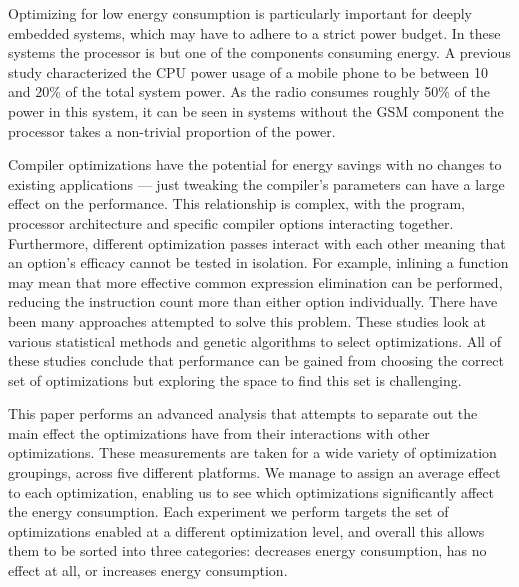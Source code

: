 \documentclass[twocolumn]{article}
\newcommand{\todo}[1]{\textbf{\textcolor{red}{#1}}}
\begin{document}
Optimizing for low energy consumption is particularly important for deeply embedded systems, which may have to adhere to a strict power budget. In these systems the processor is but one of the components consuming energy. A previous study characterized the CPU power usage of a mobile phone to be between 10 and 20\% of the total system power\cite{SmartPhonePower}. As the radio consumes roughly 50\% of the power in this system, it can be seen in systems without the GSM component the processor takes a non-trivial proportion of the power.


Compiler optimizations have the potential for energy savings with no changes to existing applications --- just tweaking the compiler's parameters can have a large effect on the performance. This relationship is complex, with the program, processor architecture and specific compiler options interacting together. Furthermore, different optimization passes interact with each other meaning that an option's efficacy cannot be tested in isolation. For example, inlining a function may mean that more effective common expression elimination can be performed, reducing the instruction count more than either option individually. There have been many approaches attempted to solve this problem\cite{Haneda2005, Lin2008, Triantafyllis}. These studies look at various statistical methods and genetic algorithms to select optimizations. All of these studies conclude that performance can be gained from choosing the correct set of optimizations but exploring the space to find this set is challenging.

This paper performs an advanced analysis that attempts to separate out the main effect the optimizations have from their interactions with other optimizations. These measurements are taken for a wide variety of optimization groupings, across five different platforms. We manage to assign an average effect to each optimization, enabling us to see which optimizations significantly affect the energy consumption. Each experiment we perform targets the set of optimizations enabled at a different optimization level, and overall this allows them to be sorted into three categories: decreases energy consumption, has no effect at all, or increases energy consumption.
\end{document}
